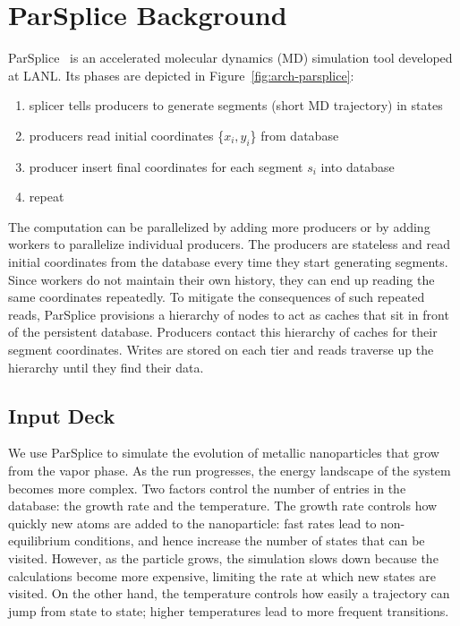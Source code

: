 \section{ParSplice Background}
\label{sec:parsplice}

ParSplice~\cite{perez:jctc20150parsplice} is an accelerated molecular dynamics
(MD) simulation tool developed at LANL. Its phases are depicted in
Figure~\ref{fig:arch-parsplice}:

\begin{enumerate}

  \item splicer tells producers to generate segments (short MD trajectory) in
  states

  \item producers read initial coordinates \{\(x_i,y_i\)\} from database 

  \item producer insert final coordinates for each segment \(s_i\) into database 

  \item repeat
\end{enumerate}

The computation can be parallelized by adding more producers or by adding
workers to parallelize individual producers.  The producers are stateless and
read initial coordinates from the database every time they start
generating segments. Since workers do not maintain their own history, they can
end up reading the same coordinates repeatedly. To mitigate the consequences of such
repeated reads, ParSplice provisions a hierarchy of nodes to act as caches that
sit in front of the persistent database. Producers contact this hierarchy of
caches for their segment coordinates. Writes are stored on each tier and reads
traverse up the hierarchy until they find their data. 

\subsection*{Input Deck}

We use ParSplice to simulate the evolution of metallic nanoparticles that grow
from the vapor phase. As the run progresses, the energy landscape of the system
becomes more complex. Two factors control the number of entries in the
database: the growth rate and the temperature. The growth rate controls how
quickly new atoms are added to the nanoparticle: fast rates lead to
non-equilibrium conditions, and hence increase the number of states that can be
visited. However, as the particle grows, the simulation slows down because the
calculations become more expensive, limiting the rate at which new states are
visited. On the other hand, the temperature controls how easily a trajectory
can jump from state to state; higher temperatures lead to more frequent
transitions.

